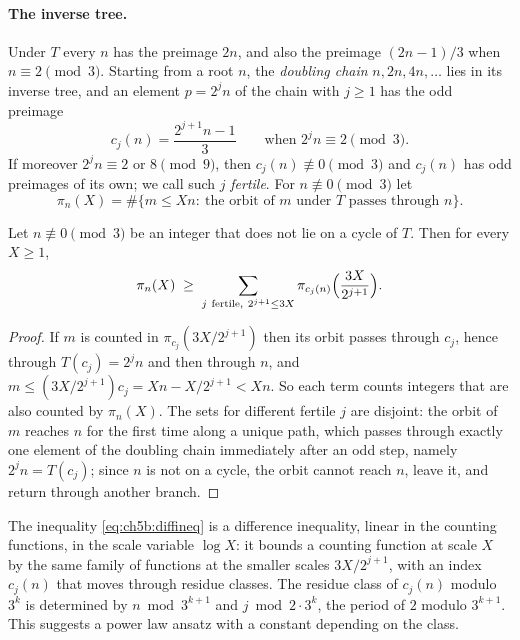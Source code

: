 \paragraph{The inverse tree.} Under $T$ every $n$ has the preimage $2n$, and
also the preimage $(2n-1)/3$ when $n\equiv2\pmod3$. Starting from a root $n$,
the \emph{doubling chain} $n,2n,4n,\dots$ lies in its inverse tree, and an
element $p=2^jn$ of the chain with $j\ge1$ has the odd preimage
\[
  c_j(n)=\frac{2^{j+1}n-1}{3}\qquad\text{when }2^jn\equiv2\pmod 3.
\]
If moreover $2^jn\equiv2$ or $8\pmod9$, then $c_j(n)\not\equiv0\pmod3$ and
$c_j(n)$ has odd preimages of its own; we call such $j$ \emph{fertile}. For
$n\not\equiv0\pmod3$ let
\[
  \pi_n(X)=\#\{m\le Xn:\ \text{the orbit of }m\text{ under }T\text{ passes through }n\}.
\]

\begin{lemma}\label{lem:ch5b:diffineq}
Let $n\not\equiv0\pmod3$ be an integer that does not lie on a cycle of $T$.
Then for every $X\ge1$,
\begin{equation}\label{eq:ch5b:diffineq}
  \pi_n(X)\;\ge\;\sum_{j\ \mathrm{fertile},\ 2^{j+1}\le3X}
  \pi_{c_j(n)}\Bigl(\frac{3X}{2^{j+1}}\Bigr).
\end{equation}
\end{lemma}

\begin{proof}
If $m$ is counted in $\pi_{c_j}(3X/2^{j+1})$ then its orbit passes through $c_j$,
hence through $T(c_j)=2^jn$ and then through $n$, and
$m\le(3X/2^{j+1})c_j=Xn-X/2^{j+1}<Xn$. So each term counts integers that are
also counted by $\pi_n(X)$. The sets for different fertile $j$ are disjoint:
the orbit of $m$ reaches $n$ for the first time along a unique path, which
passes through exactly one element of the doubling chain immediately after an
odd step, namely $2^jn=T(c_j)$; since $n$ is not on a cycle, the orbit cannot
reach $n$, leave it, and return through another branch.
\end{proof}

The inequality \eqref{eq:ch5b:diffineq} is a difference inequality, linear in the counting functions,
in the scale variable $\log X$: it bounds a counting function at scale $X$ by
the same family of functions at the smaller scales $3X/2^{j+1}$, with an index
$c_j(n)$ that moves through residue classes. The residue class of $c_j(n)$
modulo $3^k$ is determined by $n\bmod3^{k+1}$ and $j\bmod2\cdot3^k$, the period
of $2$ modulo $3^{k+1}$. This suggests a power law ansatz with a constant
depending on the class.

